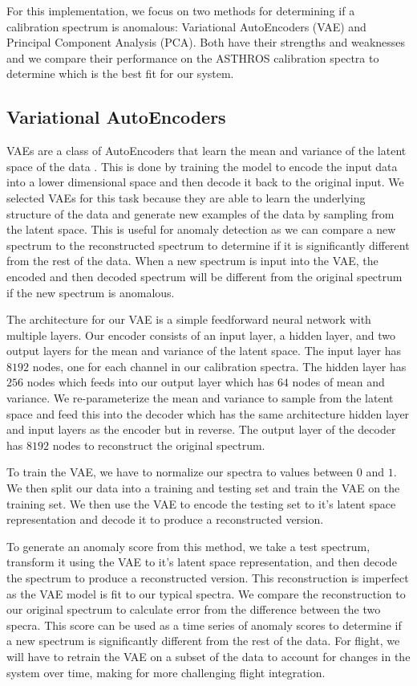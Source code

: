 For this implementation, we focus on two methods for determining if a calibration spectrum is anomalous: Variational AutoEncoders (VAE) and Principal Component Analysis (PCA).
Both have their strengths and weaknesses and we compare their performance on the ASTHROS calibration spectra to determine which is the best fit for our system.

\subsection{Variational AutoEncoders}
VAEs are a class of AutoEncoders that learn the mean and variance of the latent space of the data \parencite{kingma2013auto}.
This is done by training the model to encode the input data into a lower dimensional space and then decode it back to the original input.
We selected VAEs for this task because they are able to learn the underlying structure of the data and generate new examples of the data by sampling from the latent space.
This is useful for anomaly detection as we can compare a new spectrum to the reconstructed spectrum to determine if it is significantly different from the rest of the data.
When a new spectrum is input into the VAE, the encoded and then decoded spectrum will be different from the original spectrum if the new spectrum is anomalous.

The architecture for our VAE is a simple feedforward neural network with multiple layers.
Our encoder consists of an input layer, a hidden layer, and two output layers for the mean and variance of the latent space.
The input layer has $8192$ nodes, one for each channel in our calibration spectra.
The hidden layer has $256$ nodes which feeds into our output layer which has $64$ nodes of mean and variance.
We re-parameterize the mean and variance to sample from the latent space and feed this into the decoder which has the same architecture hidden layer and input layers as the encoder but in reverse.
The output layer of the decoder has $8192$ nodes to reconstruct the original spectrum.

To train the VAE, we have to normalize our spectra to values between $0$ and $1$.
We then split our data into a training and testing set and train the VAE on the training set.
We then use the VAE to encode the testing set to it's latent space representation and decode it to produce a reconstructed version.

To generate an anomaly score from this method, we take a test spectrum, transform it using the VAE to it's latent space representation, and then decode the spectrum to produce a reconstructed version.
This reconstruction is imperfect as the VAE model is fit to our typical spectra.
We compare the reconstruction to our original spectrum to calculate error from the difference between the two specra.
This score can be used as a time series of anomaly scores to determine if a new spectrum is significantly different from the rest of the data. 
For flight, we will have to retrain the VAE on a subset of the data to account for changes in the system over time, making for more challenging flight integration.

